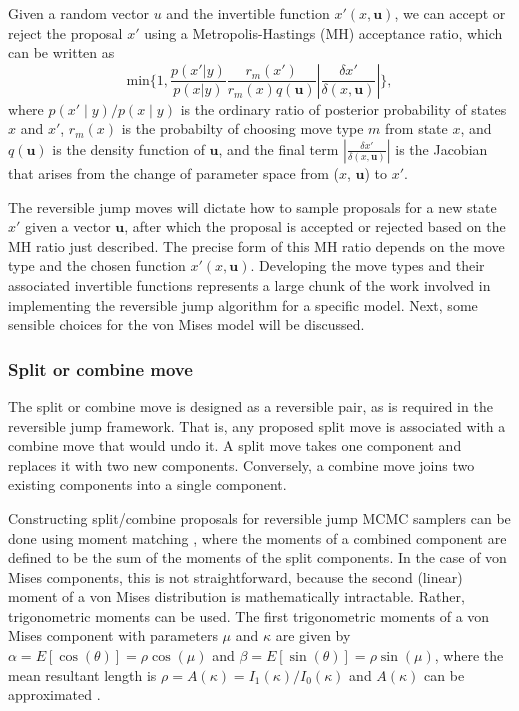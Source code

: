 Given a random vector $u$ and the invertible function $x'(x, \bm u)$, we can accept or reject the proposal $x'$ using a Metropolis-Hastings (MH) acceptance ratio, which can be written as
\begin{equation}
\label{eq:acceptance-prob}
\text{min} \bigg \{ 1, \frac{p(x' | y)}{p(x | y)} \frac{r_m(x')}{r_m(x)q(\bm u)} \left| \frac{\delta x'}{\delta (x, \bm u)} \right| \bigg \},
\end{equation}
where $p(x' \mid y)/p(x \mid y)$ is the ordinary ratio of posterior probability of states $x$ and $x'$, $r_m(x)$ is the probabilty of choosing move type $m$ from state $x$, and $q(\bm u)$ is the density function of $\bm u$, and the final term $ \left| \frac{\delta x'}{\delta (x, \bm u)} \right|$ is the Jacobian that arises from the change of parameter space from ($x$, $\bm u$) to $x'$. 

The reversible jump moves will dictate how to sample proposals for a new state $x'$ given a vector $\bm u$, after which the proposal is accepted or rejected based on the MH ratio just described. The precise form of this MH ratio depends on the move type and the chosen function $x'(x, \bm u)$.  Developing the move types and their associated invertible functions represents a large chunk of the work involved in implementing the reversible jump algorithm for a specific model.   Next, some sensible choices for the von Mises model will be discussed. 

\subsubsection{Split or combine move}
The split or combine move is designed as a reversible pair, as is required in the reversible jump framework. That is, any proposed split move is associated with a combine move that would undo it. A split move takes one component and replaces it with two new components. Conversely, a combine move joins two existing components into a single component.

Constructing split/combine proposals for reversible jump MCMC samplers can be done using moment matching \citep{Anonymous:c60Je_7X}, where the moments of a combined component are defined to be the sum of the moments of the split components. In the case of von Mises components, this is not straightforward, because the second (linear) moment of a von Mises distribution is mathematically intractable. Rather, trigonometric moments can be used. The first trigonometric moments of a von Mises component with parameters $\mu$ and $\kappa$ are given by $\alpha = E[\cos(\theta)] = \rho\cos(\mu)$ and $\beta = E[\sin(\theta)] = \rho\sin(\mu)$, where the mean resultant length is $\rho = A(\kappa) = I_1(\kappa)/I_0(\kappa)$ and $A(\kappa)$ can be approximated \citep[p. 40]{Mardia2009}. 


